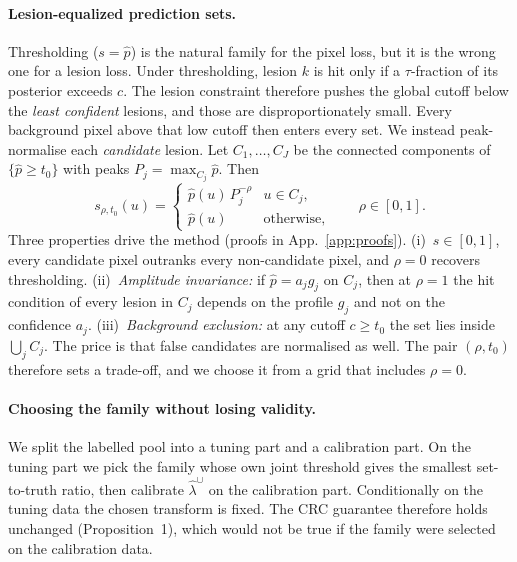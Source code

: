 \paragraph{Lesion-equalized prediction sets.}
Thresholding ($s=\hat p$) is the natural family for the pixel loss, but it is the
wrong one for a lesion loss. Under thresholding, lesion $k$ is hit only if a
$\tau$-fraction of its posterior exceeds $c$. The lesion constraint therefore
pushes the global cutoff below the \emph{least confident} lesions, and those are
disproportionately small. Every background pixel above that low cutoff then
enters every set. We instead peak-normalise each \emph{candidate} lesion. Let
$C_1,\dots,C_J$ be the connected components of $\{\hat p\ge t_0\}$ with peaks
$P_j=\max_{C_j}\hat p$. Then
\begin{equation}\label{eq:le}
s_{\rho,t_0}(u)=\begin{cases}\hat p(u)\,P_j^{-\rho} & u\in C_j,\\ \hat p(u) & \text{otherwise,}\end{cases}\qquad \rho\in[0,1].
\end{equation}
Three properties drive the method (proofs in App.~\ref{app:proofs}).
(i)~$s\in[0,1]$, every candidate pixel outranks every non-candidate pixel, and
$\rho=0$ recovers thresholding.
(ii)~\emph{Amplitude invariance:} if $\hat p=a_j g_j$ on $C_j$, then at $\rho=1$
the hit condition of every lesion in $C_j$ depends on the profile $g_j$ and not
on the confidence $a_j$.
(iii)~\emph{Background exclusion:} at any cutoff $c\ge t_0$ the set lies inside
$\bigcup_j C_j$.
The price is that false candidates are normalised as well. The pair
$(\rho,t_0)$ therefore sets a trade-off, and we choose it from a grid that
includes $\rho=0$.

\paragraph{Choosing the family without losing validity.}
We split the labelled pool into a tuning part and a calibration part. On the
tuning part we pick the family whose own joint threshold gives the smallest
set-to-truth ratio, then calibrate $\hat\lambda^\cup$ on the calibration part.
Conditionally on the tuning data the chosen transform is fixed. The CRC
guarantee therefore holds unchanged (Proposition~1), which would not be true if
the family were selected on the calibration data.
